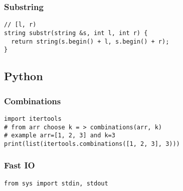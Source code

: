 \documentclass[twoside]{article}
\begin{document}
\begin{multicols*}{2}
\begin{verbatim}
\end{verbatim}

{
\subsubsection*{Substring}
}
\begin{verbatim}
// [l, r)
string substr(string &s, int l, int r) {
  return string(s.begin() + l, s.begin() + r);
}
\end{verbatim}

{
\subsection*{Python}
}
{
\subsubsection*{Combinations}
}
\begin{verbatim}
import itertools
# from arr choose k = > combinations(arr, k)
# example arr=[1, 2, 3] and k=3
print(list(itertools.combinations([1, 2, 3], 3)))
\end{verbatim}

{
\subsubsection*{Fast IO}
}
\begin{verbatim}
from sys import stdin, stdout


\end{verbatim}
\end{multicols*}
\end{document}

